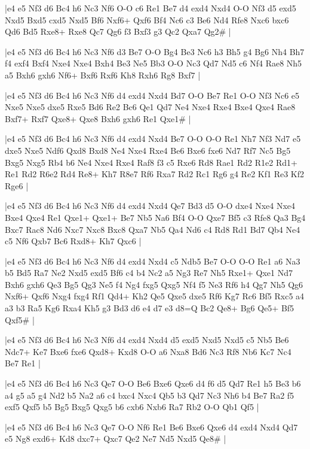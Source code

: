 \whitename{}
\blackname{}
\makegametitle
|e4 e5 Nf3 d6 Bc4 h6 Nc3 Nf6 O-O c6 Re1 Be7 d4 exd4 Nxd4 O-O Nf3 d5 exd5 Nxd5 Bxd5 cxd5 Nxd5 Bf6 Nxf6+ Qxf6 Bf4 Nc6 c3 Be6 Nd4 Rfe8 Nxc6 bxc6 Qd6 Bd5 Rxe8+ Rxe8 Qc7 Qg6 f3 Bxf3 g3 Qc2 Qxa7 Qg2\#  |

\whitename{}
\blackname{}
\makegametitle
|e4 e5 Nf3 d6 Bc4 h6 Nc3 Nf6 d3 Be7 O-O Bg4 Be3 Nc6 h3 Bh5 g4 Bg6 Nh4 Bh7 f4 exf4 Bxf4 Nxe4 Nxe4 Bxh4 Be3 Ne5 Bb3 O-O Nc3 Qd7 Nd5 c6 Nf4 Rae8 Nh5 a5 Bxh6 gxh6 Nf6+ Bxf6 Rxf6 Kh8 Rxh6 Rg8 Bxf7  |

\whitename{}
\blackname{}
\makegametitle
|e4 e5 Nf3 d6 Bc4 h6 Nc3 Nf6 d4 exd4 Nxd4 Bd7 O-O Be7 Re1 O-O Nf3 Nc6 e5 Nxe5 Nxe5 dxe5 Rxe5 Bd6 Re2 Bc6 Qe1 Qd7 Ne4 Nxe4 Rxe4 Bxe4 Qxe4 Rae8 Bxf7+ Rxf7 Qxe8+ Qxe8 Bxh6 gxh6 Re1 Qxe1\#  |

\whitename{}
\blackname{}
\makegametitle
|e4 e5 Nf3 d6 Bc4 h6 Nc3 Nf6 d4 exd4 Nxd4 Be7 O-O O-O Re1 Nh7 Nf3 Nd7 e5 dxe5 Nxe5 Ndf6 Qxd8 Bxd8 Ne4 Nxe4 Rxe4 Be6 Bxe6 fxe6 Nd7 Rf7 Nc5 Bg5 Bxg5 Nxg5 Rb4 b6 Ne4 Nxe4 Rxe4 Raf8 f3 c5 Rxe6 Rd8 Rae1 Rd2 R1e2 Rd1+ Re1 Rd2 R6e2 Rd4 Re8+ Kh7 R8e7 Rf6 Rxa7 Rd2 Rc1 Rg6 g4 Re2 Kf1 Re3 Kf2 Rge6  |

\whitename{}
\blackname{}
\makegametitle
|e4 e5 Nf3 d6 Bc4 h6 Nc3 Nf6 d4 exd4 Nxd4 Qe7 Bd3 d5 O-O dxe4 Nxe4 Nxe4 Bxe4 Qxe4 Re1 Qxe1+ Qxe1+ Be7 Nb5 Na6 Bf4 O-O Qxe7 Bf5 c3 Rfe8 Qa3 Bg4 Bxc7 Rac8 Nd6 Nxc7 Nxc8 Bxc8 Qxa7 Nb5 Qa4 Nd6 c4 Rd8 Rd1 Bd7 Qb4 Ne4 c5 Nf6 Qxb7 Bc6 Rxd8+ Kh7 Qxc6  |

\whitename{}
\blackname{}
\makegametitle
|e4 e5 Nf3 d6 Bc4 h6 Nc3 Nf6 d4 exd4 Nxd4 c5 Ndb5 Be7 O-O O-O Re1 a6 Na3 b5 Bd5 Ra7 Ne2 Nxd5 exd5 Bf6 c4 b4 Nc2 a5 Ng3 Re7 Nh5 Rxe1+ Qxe1 Nd7 Bxh6 gxh6 Qe3 Bg5 Qg3 Ne5 f4 Ng4 fxg5 Qxg5 Nf4 f5 Ne3 Rf6 h4 Qg7 Nh5 Qg6 Nxf6+ Qxf6 Nxg4 fxg4 Rf1 Qd4+ Kh2 Qe5 Qxe5 dxe5 Rf6 Kg7 Rc6 Bf5 Rxc5 a4 a3 b3 Ra5 Kg6 Rxa4 Kh5 g3 Bd3 d6 e4 d7 e3 d8=Q Bc2 Qe8+ Bg6 Qe5+ Bf5 Qxf5\#  |

\whitename{}
\blackname{}
\makegametitle
|e4 e5 Nf3 d6 Bc4 h6 Nc3 Nf6 d4 exd4 Nxd4 d5 exd5 Nxd5 Nxd5 c5 Nb5 Be6 Ndc7+ Ke7 Bxe6 fxe6 Qxd8+ Kxd8 O-O a6 Nxa8 Bd6 Nc3 Rf8 Nb6 Kc7 Nc4 Be7 Re1  |

\whitename{}
\blackname{}
\makegametitle
|e4 e5 Nf3 d6 Bc4 h6 Nc3 Qe7 O-O Be6 Bxe6 Qxe6 d4 f6 d5 Qd7 Re1 h5 Be3 b6 a4 g5 a5 g4 Nd2 b5 Na2 a6 c4 bxc4 Nxc4 Qb5 b3 Qd7 Nc3 Nh6 b4 Be7 Ra2 f5 exf5 Qxf5 b5 Bg5 Bxg5 Qxg5 b6 cxb6 Nxb6 Ra7 Rb2 O-O Qb1 Qf5  |

\whitename{}
\blackname{}
\makegametitle
|e4 e5 Nf3 d6 Bc4 h6 Nc3 Qe7 O-O Nf6 Re1 Be6 Bxe6 Qxe6 d4 exd4 Nxd4 Qd7 e5 Ng8 exd6+ Kd8 dxc7+ Qxc7 Qe2 Ne7 Nd5 Nxd5 Qe8\#  |


